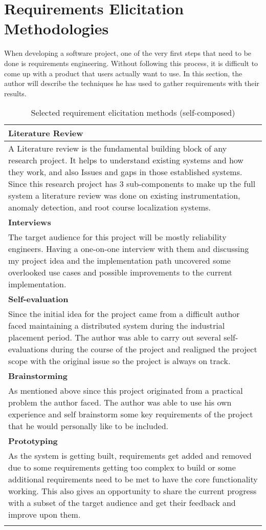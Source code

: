 \section{Requirements Elicitation Methodologies}

When developing a software project, one of the very first steps that need to be done is requirements engineering. Without following this process, it is difficult to come up with a product that users actually want to use. In this section, the author will describe the techniques he has used to gather requirements with their results.

\begin{longtable}{|p{160mm}|}
\hline
\textbf{Literature Review} \\ \hline
A Literature review is the fundamental building block of any research project. It helps to understand existing systems and how they work, and also Issues and gaps in those established systems. Since this research project has 3 sub-components to make up the full system a literature review was done on existing instrumentation, anomaly detection, and root course localization systems. \\ \hline

\textbf{Interviews} \\ \hline
The target audience for this project will be mostly reliability engineers. Having a one-on-one interview with them and discussing my project idea and the implementation path uncovered some overlooked use cases and possible improvements to the current implementation. \\ \hline


\textbf{Self-evaluation} \\ \hline
Since the initial idea for the project came from a difficult author faced maintaining a distributed system during the industrial placement period. The author was able to carry out several self-evaluations during the course of the project and realigned the project scope with the original issue so the project is always on track. \\ \hline

\textbf{Brainstorming} \\ \hline
As mentioned above since this project originated from a practical problem the author faced. The author was able to use his own experience and self brainstorm some key requirements of the project that he would personally like to be included. \\ \hline

\textbf{Prototyping} \\ \hline
As the system is getting built, requirements get added and removed due to some requirements getting too complex to build or some additional requirements need to be met to have the core functionality working. This also gives an opportunity to share the current progress with a subset of the target audience and get their feedback and improve upon them. \\ \hline

\caption{Selected requirement elicitation methods (self-composed)}
\end{longtable}

